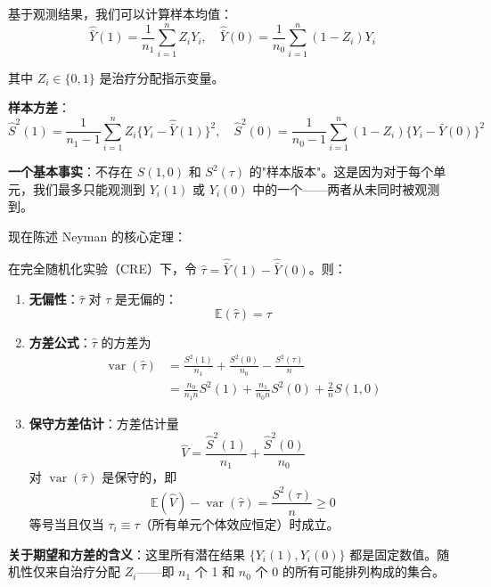 基于观测结果，我们可以计算样本均值：
\[
\hat{\bar{Y}}(1) = \frac{1}{n_1}\sum_{i=1}^n Z_i Y_i, \quad
\hat{\bar{Y}}(0) = \frac{1}{n_0}\sum_{i=1}^n (1 - Z_i) Y_i
\]

其中 $Z_i \in \{0,1\}$ 是治疗分配指示变量。

\textbf{样本方差}：
\[
\hat{S}^2(1) = \frac{1}{n_1-1}\sum_{i=1}^n Z_i\{Y_i - \hat{\bar{Y}}(1)\}^2, \quad
\hat{S}^2(0) = \frac{1}{n_0-1}\sum_{i=1}^n (1-Z_i)\{Y_i - \hat{\bar{Y}}(0)\}^2
\]

\textbf{一个基本事实}：不存在 $S(1,0)$ 和 $S^2(\tau)$ 的"样本版本"。这是因为对于每个单元，我们最多只能观测到 $Y_i(1)$ 或 $Y_i(0)$ 中的一个——两者从未同时被观测到。

现在陈述 Neyman 的核心定理：

\begin{Theorem}[Neyman (1923) 定理]\label{chap4-thm:neyman1923}
在完全随机化实验（CRE）下，令 $\hat{\tau} = \hat{\bar{Y}}(1) - \hat{\bar{Y}}(0)$。则：

\begin{enumerate}
  \item \textbf{无偏性}：$\hat{\tau}$ 对 $\tau$ 是无偏的：
    \[
    \mathbb{E}(\hat{\tau}) = \tau
    \]

  \item \textbf{方差公式}：$\hat{\tau}$ 的方差为
    \begin{align}
    \operatorname{var}(\hat{\tau}) &= \frac{S^2(1)}{n_1} + \frac{S^2(0)}{n_0} - \frac{S^2(\tau)}{n} \label{eq:neyman-var} \\
    &= \frac{n_0}{n_1 n}S^2(1) + \frac{n_1}{n_0 n}S^2(0) + \frac{2}{n}S(1,0) \label{eq:neyman-var-equivalent}
    \end{align}

  \item \textbf{保守方差估计}：方差估计量
    \[
    \hat{V} = \frac{\hat{S}^2(1)}{n_1} + \frac{\hat{S}^2(0)}{n_0}
    \]
    对 $\operatorname{var}(\hat{\tau})$ 是保守的，即
    \[
    \mathbb{E}(\hat{V}) - \operatorname{var}(\hat{\tau}) = \frac{S^2(\tau)}{n} \geq 0
    \]
    等号当且仅当 $\tau_i \equiv \tau$（所有单元个体效应恒定）时成立。
\end{enumerate}
\end{Theorem}

\textbf{关于期望和方差的含义}：这里所有潜在结果 $\{Y_i(1), Y_i(0)\}$ 都是固定数值。随机性仅来自治疗分配 $Z_i$——即 $n_1$ 个 1 和 $n_0$ 个 0 的所有可能排列构成的集合。


